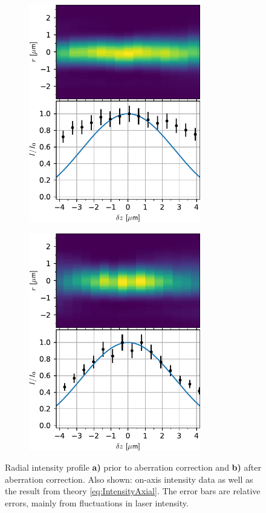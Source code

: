 \begin{figure}[t]
\centering
	\begin{subfigure}{.49\textwidth}
	    \flushleft
		\includegraphics[height=9.5cm]{figures/AxialImageTweezerScanUncorrected.pdf}
		\caption{}
		\label{fig:AxialUncorrected}
	\end{subfigure}
	\begin{subfigure}{.49\textwidth}
		\flushright
		\includegraphics[height=9.5cm]{figures/AxialImageTweezerScan.pdf}
		\caption{}
		\label{fig:AxialZernike}
	\end{subfigure}
	\caption{Radial intensity profile \textbf{a)} prior to aberration correction and \textbf{b)} after aberration correction.
	Also shown: on-axis intensity data as well as the result from theory \cref{eq:IntensityAxial}.
	The error bars are relative errors, mainly from fluctuations in laser intensity.}
	\label{fig:AxialScans}
\end{figure}

